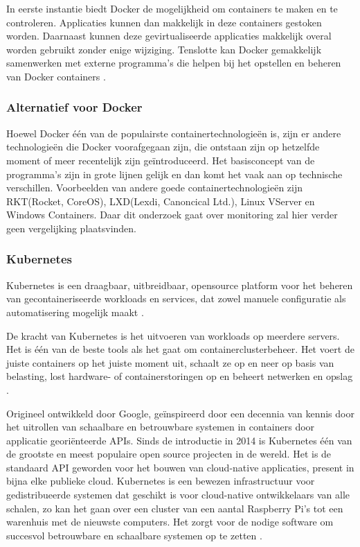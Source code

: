 In eerste instantie biedt Docker de mogelijkheid om containers te maken en te controleren. Applicaties kunnen dan makkelijk in deze containers gestoken worden. Daarnaast kunnen deze gevirtualiseerde applicaties makkelijk overal worden gebruikt zonder enige wijziging. Tenslotte kan Docker gemakkelijk samenwerken met externe programma's die helpen bij het opstellen en beheren van Docker containers \autocite{Rad2017}.
\clearpage
\subsubsection{Alternatief voor Docker}\label{sssec:AlternatiefvoorDocker}
Hoewel Docker één van de populairste containertechnologieën is, zijn er andere technologieën die Docker voorafgegaan zijn, die ontstaan zijn op hetzelfde moment of meer recentelijk zijn geïntroduceerd. Het basisconcept van de programma's zijn in grote lijnen gelijk en dan komt het vaak aan op technische verschillen. Voorbeelden van andere goede containertechnologieën zijn RKT(Rocket, CoreOS), LXD(Lexdi, Canoncical Ltd.), Linux VServer en Windows Containers. Daar dit onderzoek gaat over monitoring zal hier verder geen vergelijking plaatsvinden.

\subsubsection{Kubernetes}
Kubernetes is een draagbaar, uitbreidbaar, opensource platform voor het beheren van gecontaineriseerde workloads en services, dat zowel manuele configuratie als automatisering mogelijk maakt \autocite{Kubernetes2021}.

De kracht van Kubernetes is het uitvoeren van workloads op meerdere servers. Het is één van de beste tools als het gaat om containerclusterbeheer. Het voert de juiste containers op het juiste moment uit, schaalt ze op en neer op basis van belasting, lost hardware- of containerstoringen op en beheert netwerken en opslag \autocite{Rancher2020}.

Origineel ontwikkeld door Google, geïnspireerd door een decennia van kennis door het uitrollen van schaalbare en betrouwbare systemen in containers door applicatie georiënteerde APIs. Sinds de introductie in 2014 is Kubernetes één van de grootste en meest populaire open source projecten in de wereld. Het is de standaard API geworden voor het bouwen van cloud-native applicaties, present in bijna elke publieke cloud. Kubernetes is een bewezen infrastructuur voor gedistribueerde systemen dat geschikt is voor cloud-native ontwikkelaars van alle schalen, zo kan het gaan over een cluster van een aantal Raspberry Pi's tot een warenhuis met de nieuwste computers. Het zorgt voor de nodige software om succesvol betrouwbare en schaalbare systemen op te zetten \autocite{Burns2019}.

